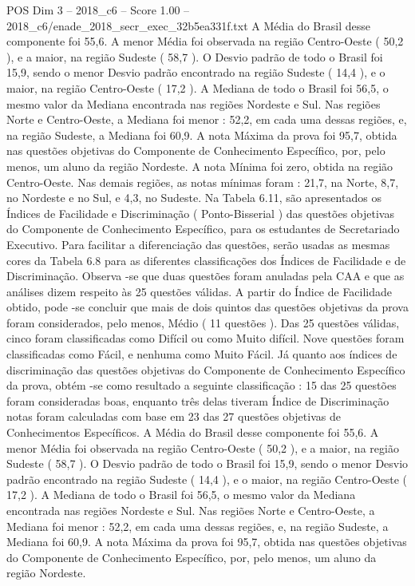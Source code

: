 \begin{textsample}{POS Dim 3 – 2018\_c6 – Score 1.00 – 2018\_c6/enade\_2018\_secr\_exec\_32b5ea331f.txt}
A Média do Brasil desse componente foi 55,6.
A menor Média foi observada na região Centro-Oeste ( 50,2 ), e a maior, na região Sudeste ( 58,7 ).
O Desvio padrão de todo o Brasil foi 15,9, sendo o menor Desvio padrão encontrado na região Sudeste ( 14,4 ), e o maior, na região Centro-Oeste ( 17,2 ).
A Mediana de todo o Brasil foi 56,5, o mesmo valor da Mediana encontrada nas regiões Nordeste e Sul.
Nas regiões Norte e Centro-Oeste, a Mediana foi menor : 52,2, em cada uma dessas regiões, e, na região Sudeste, a Mediana foi 60,9.
A nota Máxima da prova foi 95,7, obtida nas questões objetivas do Componente de Conhecimento Específico, por, pelo menos, um aluno da região Nordeste.
A nota Mínima foi zero, obtida na região Centro-Oeste.
Nas demais regiões, as notas mínimas foram : 21,7, na Norte, 8,7, no Nordeste e no Sul, e 4,3, no Sudeste.
Na Tabela 6.11, são apresentados os Índices de Facilidade e Discriminação ( Ponto-Bisserial ) das questões objetivas do Componente de Conhecimento Específico, para os estudantes de Secretariado Executivo.
Para facilitar a diferenciação das questões, serão usadas as mesmas cores da Tabela 6.8 para as diferentes classificações dos Índices de Facilidade e de Discriminação.
Observa -se que duas questões foram anuladas pela CAA e que as análises dizem respeito às 25 questões válidas.
A partir do Índice de Facilidade obtido, pode -se concluir que mais de dois quintos das questões objetivas da prova foram considerados, pelo menos, Médio ( 11 questões ).
Das 25 questões válidas, cinco foram classificadas como Difícil ou como Muito difícil.
Nove questões foram classificadas como Fácil, e nenhuma como Muito Fácil.
Já quanto aos índices de discriminação das questões objetivas do Componente de Conhecimento Específico da prova, obtém -se como resultado a seguinte classificação : 15 das 25 questões foram consideradas boas, enquanto três delas tiveram Índice de Discriminação notas foram calculadas com base em 23 das 27 questões objetivas de Conhecimentos Específicos.
A Média do Brasil desse componente foi 55,6.
A menor Média foi observada na região Centro-Oeste ( 50,2 ), e a maior, na região Sudeste ( 58,7 ).
O Desvio padrão de todo o Brasil foi 15,9, sendo o menor Desvio padrão encontrado na região Sudeste ( 14,4 ), e o maior, na região Centro-Oeste ( 17,2 ).
A Mediana de todo o Brasil foi 56,5, o mesmo valor da Mediana encontrada nas regiões Nordeste e Sul.
Nas regiões Norte e Centro-Oeste, a Mediana foi menor : 52,2, em cada uma dessas regiões, e, na região Sudeste, a Mediana foi 60,9.
A nota Máxima da prova foi 95,7, obtida nas questões objetivas do Componente de Conhecimento Específico, por, pelo menos, um aluno da região Nordeste.

\end{textsample}

